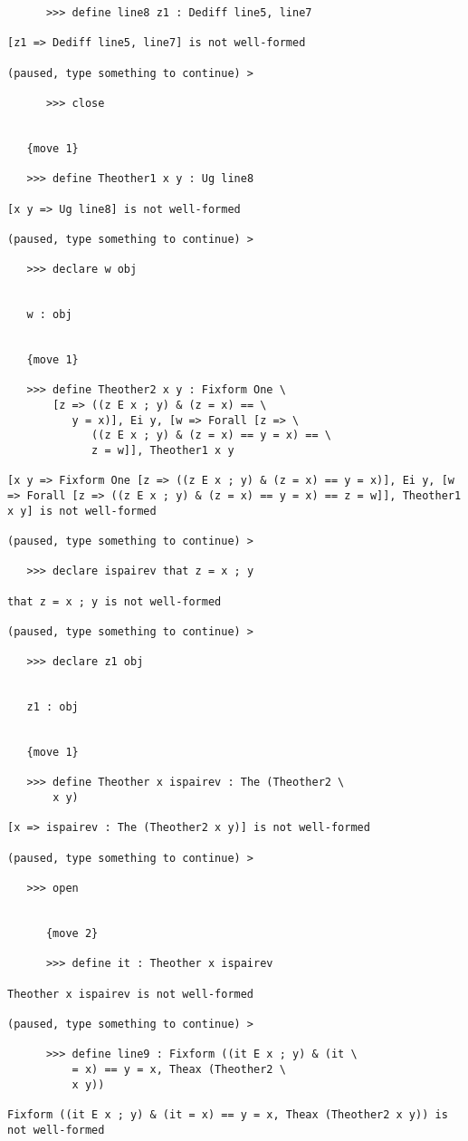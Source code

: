 \documentclass[12pt]{article}
\begin{document}
\begin{verbatim}
      >>> define line8 z1 : Dediff line5, line7

[z1 => Dediff line5, line7] is not well-formed

(paused, type something to continue) >

      >>> close


   {move 1}

   >>> define Theother1 x y : Ug line8

[x y => Ug line8] is not well-formed

(paused, type something to continue) >

   >>> declare w obj


   w : obj


   {move 1}

   >>> define Theother2 x y : Fixform One \
       [z => ((z E x ; y) & (z = x) == \
          y = x)], Ei y, [w => Forall [z => \
             ((z E x ; y) & (z = x) == y = x) == \
             z = w]], Theother1 x y

[x y => Fixform One [z => ((z E x ; y) & (z = x) == y = x)], Ei y, [w => Forall [z => ((z E x ; y) & (z = x) == y = x) == z = w]], Theother1 x y] is not well-formed

(paused, type something to continue) >

   >>> declare ispairev that z = x ; y

that z = x ; y is not well-formed

(paused, type something to continue) >

   >>> declare z1 obj


   z1 : obj


   {move 1}

   >>> define Theother x ispairev : The (Theother2 \
       x y)

[x => ispairev : The (Theother2 x y)] is not well-formed

(paused, type something to continue) >

   >>> open


      {move 2}

      >>> define it : Theother x ispairev

Theother x ispairev is not well-formed

(paused, type something to continue) >

      >>> define line9 : Fixform ((it E x ; y) & (it \
          = x) == y = x, Theax (Theother2 \
          x y))

Fixform ((it E x ; y) & (it = x) == y = x, Theax (Theother2 x y)) is not well-formed


\end{verbatim}
\end{document}
